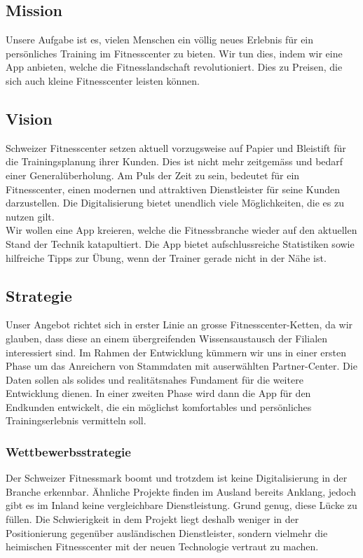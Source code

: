 \subsection{Mission}
Unsere Aufgabe ist es, vielen Menschen ein völlig neues Erlebnis für ein persönliches Training im Fitnesscenter zu bieten. Wir tun dies, indem wir eine App anbieten, welche die Fitnesslandschaft revolutioniert. Dies zu Preisen, die sich auch kleine Fitnesscenter leisten können.

\subsection{Vision}
Schweizer Fitnesscenter setzen aktuell vorzugsweise auf Papier und Bleistift für die Trainingsplanung ihrer Kunden. Dies ist nicht mehr zeitgemäss und bedarf einer Generalüberholung. Am Puls der Zeit zu sein, bedeutet für ein Fitnesscenter, einen modernen und attraktiven Dienstleister für seine Kunden darzustellen. Die Digitalisierung bietet unendlich viele Möglichkeiten, die es zu nutzen gilt. \\
Wir wollen eine App kreieren, welche die Fitnessbranche wieder auf den aktuellen Stand der Technik katapultiert. Die App bietet aufschlussreiche Statistiken sowie hilfreiche Tipps zur Übung, wenn der Trainer gerade nicht in der Nähe ist.

\subsection{Strategie}
Unser Angebot richtet sich in erster Linie an grosse Fitnesscenter-Ketten, da wir glauben, dass diese an einem übergreifenden Wissensaustausch der Filialen interessiert sind. Im Rahmen der Entwicklung kümmern wir uns in einer ersten Phase um das Anreichern von Stammdaten mit auserwählten Partner-Center. Die Daten sollen als solides und realitätsnahes Fundament für die weitere Entwicklung dienen. In einer zweiten Phase wird dann die App für den Endkunden entwickelt, die ein möglichst komfortables und persönliches Trainingserlebnis vermitteln soll. 

\subsubsection{Wettbewerbsstrategie}
Der Schweizer Fitnessmark boomt und trotzdem ist keine Digitalisierung in der Branche erkennbar. Ähnliche Projekte finden im Ausland bereits Anklang, jedoch gibt es im Inland keine vergleichbare Dienstleistung. Grund genug, diese Lücke zu füllen. Die Schwierigkeit in dem Projekt liegt deshalb weniger in der Positionierung gegenüber ausländischen Dienstleister, sondern vielmehr die heimischen Fitnesscenter mit der neuen Technologie vertraut zu machen.


